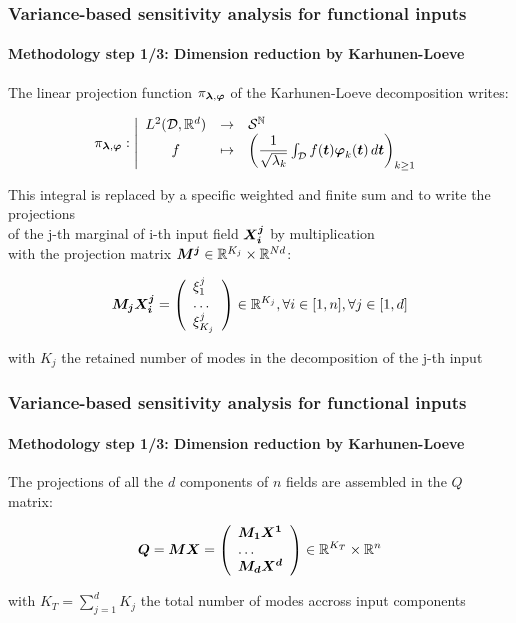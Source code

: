 \documentclass[aspectratio=169]{beamer}
\begin{document}
\begin{frame}
\frametitle{Variance-based sensitivity analysis for functional inputs}

\framesubtitle{Methodology step 1/3: Dimension reduction by Karhunen-Loeve}

The linear projection function $\pi_{ {\mathbf{\boldsymbol{{\lambda}}}}, {\mathbf{\boldsymbol{{\varphi}}}}}$ of
the Karhunen-Loeve decomposition writes:

$$
    \pi_{{\mathbf{\boldsymbol{{\lambda}}}}, {\mathbf{\boldsymbol{{\varphi}}}}}: \left|
      \begin{array}{ccl}
        L^2({\mathcal D}, \mathbb{R}^d) & \rightarrow & {\mathcal S}^{{\mathbb N}} \\
        f & \mapsto &\left(\dfrac{1}{\sqrt{\lambda_k}}\int_{{\mathcal D}}f({\mathbf{\boldsymbol{{t}}}}) {\mathbf{\boldsymbol{{\varphi}}}}_k({\mathbf{\boldsymbol{{t}}}})\, d{\mathbf{\boldsymbol{{t}}}}\right)_{k \geq 1}
      \end{array}
    \right.
$$

This integral is replaced by a specific weighted and finite sum and to write the projections\\
of the j-th marginal of i-th input field ${\mathbf{\boldsymbol{{X_i^j}}}}$ by multiplication\\
with the projection matrix ${{\mathbf{\boldsymbol{{{\mathbf{\boldsymbol{{M^j}}}}}}}}} \in \mathbb{R}^{K_j} \times \mathbb{R}^{Nd}$:

$$
    {{\mathbf{\boldsymbol{{{\mathbf{\boldsymbol{{M_j}}}}}}}}} {\mathbf{\boldsymbol{{X_i^j}}}} = \left( \begin{array}{l} \xi_1^j \\ \dots \\ \xi_{K_j}^j \end{array} \right)
    \in \mathbb{R}^{K_j}, \forall i \in [1, n], \forall j \in [1, d]
$$

with $K_j$ the retained number of modes in the decomposition of the j-th input

\end{frame}

\begin{frame}
\frametitle{Variance-based sensitivity analysis for functional inputs}

\framesubtitle{Methodology step 1/3: Dimension reduction by Karhunen-Loeve}

The projections of all the $d$ components of $n$ fields are assembled in the $Q$ matrix:

$$
        {{\mathbf{\boldsymbol{{{\mathbf{\boldsymbol{{Q}}}}}}}}} = {{\mathbf{\boldsymbol{{{\mathbf{\boldsymbol{{M}}}}}}}}} {{\mathbf{\boldsymbol{{{\mathbf{\boldsymbol{{X}}}}}}}}} =
        \left(
          \begin{array}{l}
            {{\mathbf{\boldsymbol{{{\mathbf{\boldsymbol{{M_1}}}}}}}}} {{\mathbf{\boldsymbol{{{\mathbf{\boldsymbol{{X^1}}}}}}}}} \\
            \dots \\
            {{\mathbf{\boldsymbol{{{\mathbf{\boldsymbol{{M_d}}}}}}}}} {{\mathbf{\boldsymbol{{{\mathbf{\boldsymbol{{X^d}}}}}}}}}
          \end{array}
        \right) \in \mathbb{R}^{K_T} \times \mathbb{R}^n
$$

with $K_T = \sum_{j=1}^d{K_j}$ the total number of modes accross input components

\end{frame}
\end{document}
